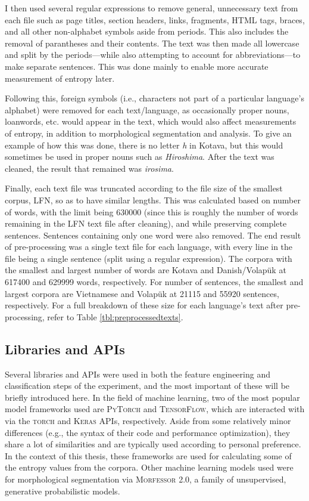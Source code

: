 \documentclass[12pt,a4paper]{article}
\numberwithin{figure}{section}
\numberwithin{table}{section}
\numberwithin{definition}{section}
\begin{document}
I then used several regular expressions to remove general, unnecessary text from each file such as page titles, section headers, links, fragments, HTML tags, braces, and all other non-alphabet symbols aside from periods. This also includes the removal of parantheses and their contents. The text was then made all lowercase and split by the periods---while also attempting to account for abbreviations---to make separate sentences. This was done mainly to enable more accurate measurement of entropy later.

Following this, foreign symbols (i.e., characters not part of a particular language's alphabet) were removed for each text/language, as occasionally proper nouns, loanwords, etc. would appear in the text, which would also affect measurements of entropy, in addition to morphological segmentation and analysis. To give an example of how this was done, there is no letter \textit{h} in Kotava, but this would sometimes be used in proper nouns such as \textit{Hiroshima}. After the text was cleaned, the result that remained was \textit{irosima}. 

Finally, each text file was truncated according to the file size of the smallest corpus, LFN, so as to have similar lengths. This was calculated based on number of words, with the limit being 630000 (since this is roughly the number of words remaining in the LFN text file after cleaning), and while preserving complete sentences. Sentences containing only one word were also removed. The end result of pre-processing was a single text file for each language, with every line in the file being a single sentence (split using a regular expression). The corpora with the smallest and largest number of words are Kotava and Danish/Volapük at 617400 and 629999 words, respectively. For number of sentences, the smallest and largest corpora are Vietnamese and Volapük at 21115 and 55920 sentences, respectively. For a full breakdown of these size for each language's text after pre-processing, refer to Table \ref{tbl:preprocessedtexts}.

\subsection{Libraries and APIs}
\label{ssec:librariesandapis}

Several libraries and APIs were used in both the feature engineering and classification steps of the experiment, and the most important of these will be briefly introduced here. In the field of machine learning, two of the most popular model frameworks used are \textsc{PyTorch}\parencite{Paszke2017article} and \textsc{TensorFlow}\parencite{Chollet2015article}, which are interacted with via the \textsc{torch} and \textsc{Keras} APIs, respectively. Aside from some relatively minor differences (e.g., the syntax of their code and performance optimization), they share a lot of similarities and are typically used according to personal preference. In the context of this thesis, these frameworks are used for calculating some of the entropy values from the corpora. Other machine learning models used were for morphological segmentation via \textsc{Morfessor 2.0}\parencite{Virpioja2013inproceedings,Creutz2002article}, a family of unsupervised, generative probabilistic models. 
\end{document}
